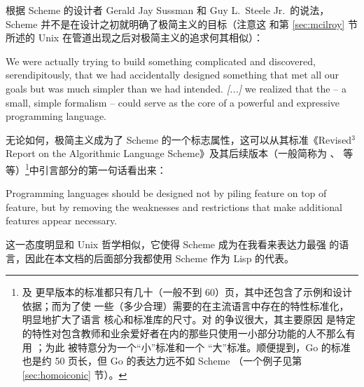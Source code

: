 根据 Scheme 的设计者 Gerald Jay Sussman 和 Guy L.\ Steele Jr.\ 的说法，%
Scheme 并不是在设计之初就明确了极简主义的目标（注意这
和第 \ref{sec:mcilroy} 节所述的 Unix 在管道出现之后对极简主义的追求何其相似）：
\begin{quoting}
	We were actually trying to build something complicated
	and discovered, serendipitously, that we had accidentally
	designed something that met all our goals but was much simpler
	than we had intended.  \emph{[...]} we realized that the
	 -- a small, simple formalism --
	could serve as the core of a powerful and expressive programming language.
\end{quoting}
无论如何，极简主义成为了 Scheme 的一个标志属性，这可以从其标准《Revised$^3$
Report on the Algorithmic Language Scheme》及其后续版本（一般简称为 、%
 等等）\footnote{\label{fn:r6rs} 及
更早版本的标准都只有几十（一般不到 60）页，其中还包含了示例和设计依据；而为了使
一些（多少合理）需要的在主流语言中存在的特性标准化， 明显地扩大了语言
核心和标准库的尺寸。对  的争议很大，其主要原因
是特定的特性对包含教师和业余爱好者在内的那些只使用一小部分功能的人不那么有用%
；为此 被特意分为一个“小”标准和一个
“大”标准。顺便提到，Go 的标准也是约 50 页长，但 Go 的表达力远不如 Scheme%
（一个例子见第 \ref{sec:homoiconic} 节）。}中引言部分的第一句话看出来：
\begin{quoting}
	Programming languages should be designed not by piling
	feature on top of feature, but by removing the weaknesses and
	restrictions that make additional features appear necessary.
\end{quoting}
这一态度明显和 Unix 哲学相似，它使得 Scheme 成为在我看来表达力最强
的语言，因此在本文档的后面部分我都使用 Scheme 作为 Lisp 的代表。

